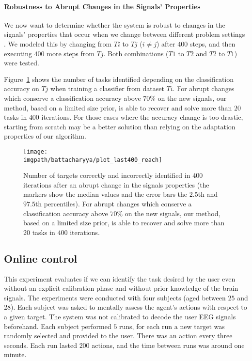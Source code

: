 \paragraph{Robustness to Abrupt Changes in the Signals' Properties }
\label{CenterRobustnessToAbruptChangesInTheSignalsProperties}

We now want to determine whether the system is robust to changes in the signals' properties that occur when we change between different problem settings \cite{iturrate2013task}. We modeled this by changing from $Ti$ to $Tj$ ($i \neq j$) after $400$ steps, and then executing $400$ more steps from $Tj$. Both combinations ($T1$ to $T2$ and $T2$ to $T1$) were tested.

Figure~\ref{fig:stage2} shows the number of tasks identified depending on the classification accuracy on $Tj$ when training a classifier from dataset $Ti$. For abrupt changes which conserve a classification accuracy above $70\%$ on the new signals, our method, based on a limited size prior, is able to recover and solve more than $20$ tasks in $400$ iterations. For those cases where the accuracy change is too drastic, starting from scratch may be a better solution than relying on the adaptation properties of our algorithm.

\begin{figure}[!ht]
    \centering
    \texttt{[image: \\imgpath/battacharyya/plot\_last400\_reach]}
    \caption{Number of targets correctly and incorrectly identified in $400$ iterations after an abrupt change in the signals properties (the markers show the median values and the error bars the $2.5$th and $97.5$th percentiles). For abrupt changes which conserve a classification accuracy above $70\%$ on the new signals, our method, based on a limited size prior, is able to recover and solve more than $20$ tasks in $400$ iterations.}
    \label{fig:stage2}
\end{figure}

\subsection{Online control}

This experiment evaluates if we can identify the task desired by the user even without an explicit calibration phase and without prior knowledge of the brain signals. The experiments were conducted with four subjects (aged between $25$ and $28$). Each subject was asked to mentally assess the agent's actions with respect to a given target. The system was not calibrated to decode the user EEG signals beforehand. Each subject performed $5$ runs, for each run a new target was randomly selected and provided to the user. There was an action every three seconds. Each run lasted $200$ actions, and the time between runs was around one minute.

